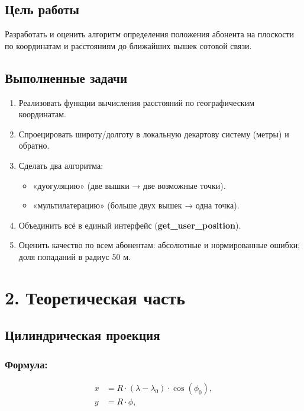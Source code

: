 \documentclass[a4paper,14pt]{extarticle}
\begin{document}
    \subsection*{Цель работы}

    Разработать и оценить алгоритм определения положения абонента на плоскости
    по координатам и расстояниям до ближайших вышек сотовой связи.

    \subsection*{Выполненные задачи}
    \begin{enumerate}
        \item Реализовать функции вычисления расстояний по географическим координатам.
        \item Спроецировать широту/долготу в локальную декартову систему (метры) и обратно.
        \item Сделать два алгоритма:
        \begin{itemize}
            \item «дуогуляцию» (две вышки → две возможные точки).
            \item «мультилатерацию» (больше двух вышек → одна точка).
        \end{itemize}
        \item Объединить всё в единый интерфейс (\textbf{get\_user\_position}).
        \item Оценить качество по всем абонентам: абсолютные и нормированные ошибки; доля попаданий в радиус 50 м.
    \end{enumerate}

    \section*{2. Теоретическая часть}
    \subsection*{Цилиндрическая проекция}

    \subsubsection*{Формула:}
    \begin{equation}
        \begin{aligned}
            x &= R \cdot (\lambda - \lambda_0) \cdot \cos(\phi_0), \\
            y &= R \cdot \phi,
        \end{aligned}
    \end{equation}
\end{document}
